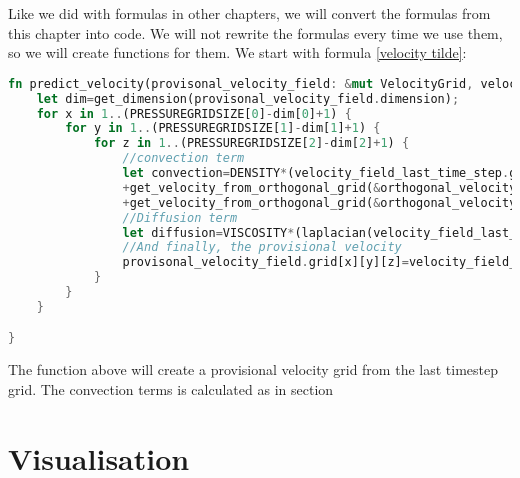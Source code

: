 \documentclass{article}
\begin{document}
Like we did with formulas in other chapters, we will convert the formulas from this chapter into code. We will not rewrite the formulas every time we use them, so we will create functions for them. We start with formula \ref{velocity tilde}:

\begin{lstlisting}[language=Rust, style=boxed, breaklines=true]
fn predict_velocity(provisonal_velocity_field: &mut VelocityGrid, velocity_field_last_time_step: &VelocityGrid, orthogonal_velocity_field_a: &VelocityGrid, orthogonal_velocity_field_b: &VelocityGrid, pressure_grid: [[[f32; PRESSUREGRIDSIZE[2]]; PRESSUREGRIDSIZE[1]]; PRESSUREGRIDSIZE[0]]){
    let dim=get_dimension(provisonal_velocity_field.dimension);
    for x in 1..(PRESSUREGRIDSIZE[0]-dim[0]+1) {
        for y in 1..(PRESSUREGRIDSIZE[1]-dim[1]+1) {
            for z in 1..(PRESSUREGRIDSIZE[2]-dim[2]+1) {
                //convection term
                let convection=DENSITY*(velocity_field_last_time_step.grid[x][y][z]*second_order_spatial_derivative(&velocity_field_last_time_step, x, y, z, velocity_field_last_time_step.dimension)
                +get_velocity_from_orthogonal_grid(&orthogonal_velocity_field_a, x, y, z, velocity_field_last_time_step.dimension)*second_order_second_spatial_derivative(velocity_field_last_time_step, x, y, z, orthogonal_velocity_field_a.dimension)
                +get_velocity_from_orthogonal_grid(&orthogonal_velocity_field_b, x, y, z, velocity_field_last_time_step.dimension)*second_order_second_spatial_derivative(velocity_field_last_time_step, x, y, z, orthogonal_velocity_field_b.dimension));
                //Diffusion term
                let diffusion=VISCOSITY*(laplacian(velocity_field_last_time_step, x, y, z));
                //And finally, the provisional velocity
                provisonal_velocity_field.grid[x][y][z]=velocity_field_last_time_step.grid[x][y][z]+TIMESTEPSIZE/DENSITY*(-convection+first_order_central_spatial_pressure_derivative(pressure_grid, x-1, y-1, z-1, velocity_field_last_time_step.dimension)+diffusion+EXTERNALFORCE[velocity_field_last_time_step.dimension]);
            }
        }
    }

}
\end{lstlisting}
The function above will create a provisional velocity grid from the last timestep grid. The convection terms is calculated as in section \





\newpage  
\section{Visualisation}
\end{document}
